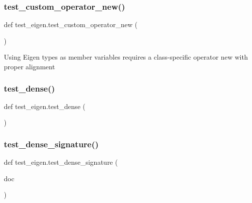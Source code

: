 \mbox{\label{namespacetest__eigen_accb765e41bdd8973d2c7392c45dce52b}} 
\subsubsection{\texorpdfstring{test\_custom\_operator\_new()}{test\_custom\_operator\_new()}}
{\footnotesize\ttfamily def test\+\_\+eigen.\+test\+\_\+custom\+\_\+operator\+\_\+new (\begin{DoxyParamCaption}{ }\end{DoxyParamCaption})}

\begin{DoxyVerb}Using Eigen types as member variables requires a class-specific
operator new with proper alignment\end{DoxyVerb}
 \mbox{\label{namespacetest__eigen_ad89789fe1b480e2e726dfb9d2d2fe33d}} 
\subsubsection{\texorpdfstring{test\_dense()}{test\_dense()}}
{\footnotesize\ttfamily def test\+\_\+eigen.\+test\+\_\+dense (\begin{DoxyParamCaption}{ }\end{DoxyParamCaption})}

\mbox{\label{namespacetest__eigen_a61d80fa73bf0e2246a38e2b0181330ed}} 
\subsubsection{\texorpdfstring{test\_dense\_signature()}{test\_dense\_signature()}}
{\footnotesize\ttfamily def test\+\_\+eigen.\+test\+\_\+dense\+\_\+signature (\begin{DoxyParamCaption}\item[{}]{doc }\end{DoxyParamCaption})}

